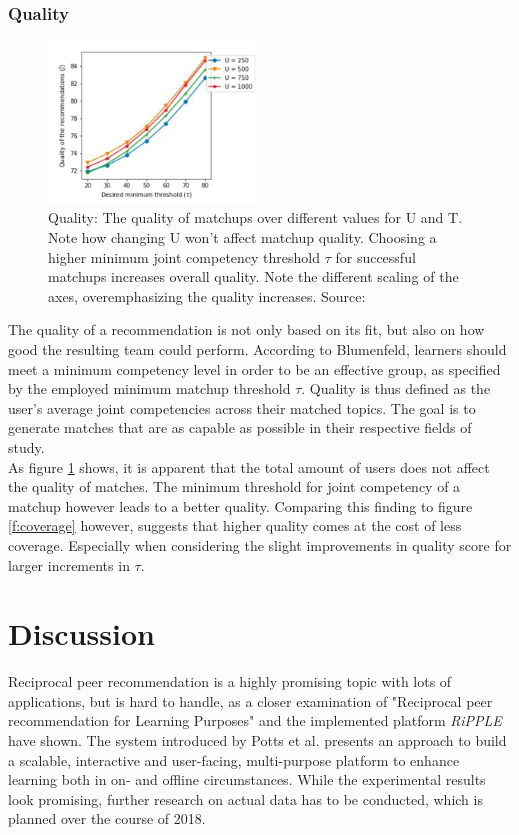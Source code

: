 \documentclass[conference]{IEEEtran}
\begin{document}
\subsubsection{Quality} \label{paper:quality}
\begin{figure}[!t]
	\centering
	\includegraphics[width=0.5\textwidth]{g/QualityByU.PNG}
	\caption{Quality: The quality of matchups over different values for U and T. Note how changing U won't affect matchup quality. Choosing a higher minimum joint competency threshold \(\tau\) for successful matchups increases overall quality. Note the different scaling of the axes, overemphasizing the quality increases. Source: \cite{potts2018reciprocal}}
	\label{f:quality}
\end{figure}
The quality of a recommendation is not only based on its fit, but also on how good the resulting team could perform. According to Blumenfeld, learners should meet a minimum competency level in order to be an effective group, as specified by the employed minimum matchup threshold \(\tau\). \cite{blumenfeld1996learning} Quality is thus defined as the user's average joint competencies across their matched topics. The goal is to generate matches that are as capable as possible in their respective fields of study.\\
As figure \ref{f:quality} shows, it is apparent that the total amount of users does not affect the quality of matches. The minimum threshold for joint competency of a matchup however leads to a better quality. Comparing this finding to figure \ref{f:coverage} however, suggests that higher quality comes at the cost of less coverage. Especially when considering the slight improvements in quality score for larger increments in \(\tau\).\\

\section{Discussion} \label{extensions}\label{paper:discussion}
Reciprocal peer recommendation is a highly promising topic with lots of applications, but is hard to handle, as a closer examination of "Reciprocal peer recommendation for Learning Purposes" and the implemented platform \textit{RiPPLE} have shown. The system introduced by Potts et al. presents an approach to build a scalable, interactive and user-facing, multi-purpose platform to enhance learning both in on- and offline circumstances. While the experimental results look promising, further research on actual data has to be conducted, which is planned over the course of 2018.\\
\end{document}
